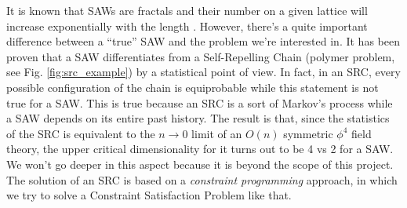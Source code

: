 It is known that SAWs are fractals and their number on a given lattice will increase exponentially with the length \cite{madras1988pivot}.
However, there's a quite important difference between a ``true'' SAW and the problem we're interested in.
It has been proven \cite{trueSAW} that a SAW differentiates from a Self-Repelling Chain (polymer problem, see Fig. \ref{fig:src_example}) by a statistical point of view.
In fact, in an SRC, every possible configuration of the chain is equiprobable while this statement is not true for a SAW.
This is true because an SRC is a sort of Markov's process while a SAW depends on its entire past history.
The result is that, since the statistics of the SRC is equivalent to the $n \to 0$ limit of an $O(n)$ symmetric $\phi^4$ field theory, the upper critical dimensionality for it turns out to be 4 vs 2 for a SAW.
We won't go deeper in this aspect because it is beyond the scope of this project.
The solution of an SRC is based on a \emph{constraint programming} approach, in which we try to solve a Constraint Satisfaction Problem like that.

